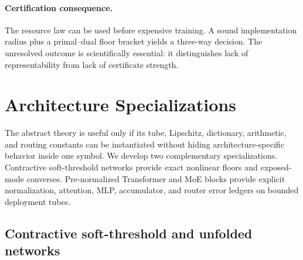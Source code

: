 \documentclass[twoside,11pt]{article}
\begin{document}
\paragraph{Certification consequence.}
The resource law can be used before expensive training.  A sound implementation radius plus a primal--dual floor bracket yields a three-way decision.  The unresolved outcome is scientifically essential: it distinguishes lack of representability from lack of certificate strength.

\FloatBarrier

\section{Architecture Specializations}
\label{sec:architecture-specializations-main}
\label{sec:architectures}

The abstract theory is useful only if its tube, Lipschitz, dictionary, arithmetic, and routing constants can be instantiated without hiding architecture-specific behavior inside one symbol.  We develop two complementary specializations.  Contractive soft-threshold networks provide exact nonlinear floors and exposed-mode converses.  Pre-normalized Transformer and MoE blocks provide explicit normalization, attention, MLP, accumulator, and router error ledgers on bounded deployment tubes.

\subsection{Contractive soft-threshold and unfolded networks}
\label{sec:soft-threshold-main}
\end{document}
